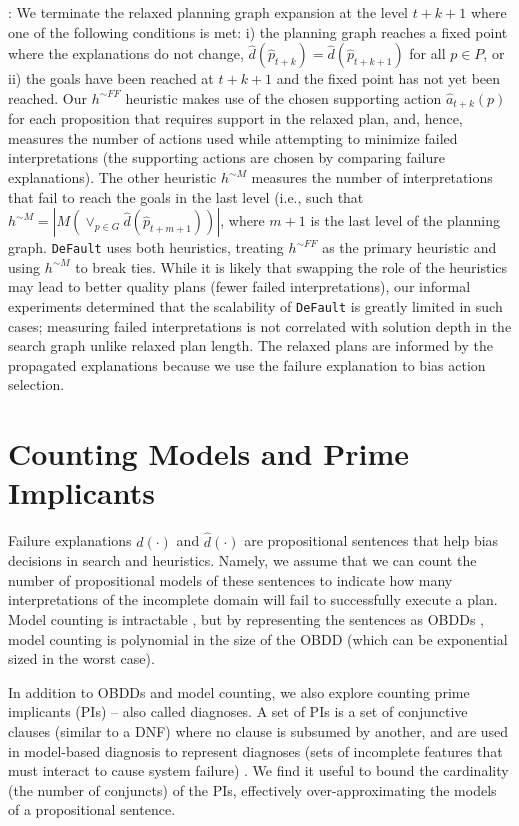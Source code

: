 \documentclass[letterpaper]{article}
\def\und#1{\noindent{\bf #1}:}
\def\default{{\tt DeFault}}
\def\citep#1{\cite{#1}}
\begin{document}
\und{Heuristic Computation}   We terminate the relaxed planning graph expansion
at the level $t+k+1$ where one of the following conditions is met: i) the
planning graph reaches a fixed point where the explanations do not change,
$\hat{d}(\hat{p}_{t+k}) = \hat{d}(\hat{p}_{t+k+1})$ for all $p\in P$, or ii) the
goals have been reached at $t+k+1$ and the fixed point has not yet been reached.
Our $h^{\sim FF}$ heuristic makes use of the chosen supporting action
$\hat{a}_{t+k}(p)$ for each proposition that requires support in the relaxed
plan, and, hence, measures the number of actions used while attempting to
minimize failed interpretations (the supporting actions are chosen by comparing
failure explanations). The other heuristic $h^{\sim M}$ measures the number of
interpretations that fail to reach the goals in the last level (i.e., such that 
$h^{\sim M} = |M(\vee_{p \in G} \hat{d}(\hat{p}_{t+m+1}))|$, where $m+1$ is the
last level of the planning graph. \default{} uses both heuristics, treating 
$h^{\sim FF}$ as the primary heuristic and using $h^{\sim M}$ to break ties. 
While it is likely that swapping the role of the heuristics may lead to better
quality plans (fewer failed interpretations), our informal experiments
determined that the scalability of \default{} is greatly limited in such cases;
measuring failed interpretations is not correlated with solution depth in the
search graph unlike relaxed plan length.  The relaxed plans are informed by the
propagated explanations because we use the failure explanation to bias action
selection.

\section{Counting Models and Prime Implicants }

Failure explanations $d(\cdot)$ and $\hat{d}(\cdot)$ are propositional sentences
that help bias decisions in search and heuristics.  Namely, we assume that we
can count the number of propositional models of these sentences to indicate how
many interpretations of the incomplete domain will fail to successfully execute
a plan.  Model counting is intractable \citep{Roth96}, but by representing the
sentences as OBDDs \citep{bryant-ieeetc86}, model counting is polynomial in the
size of the OBDD \citep{darwiche} (which can be exponential sized in the worst
case).

In addition to OBDDs and model counting, we also explore counting prime
implicants (PIs) -- also called diagnoses.  A set of PIs is a set of conjunctive
clauses (similar to a DNF) where no clause is subsumed by another, and are used
in model-based diagnosis to represent diagnoses (sets of incomplete features
that must interact to cause system failure) \citep{dekleer}.  We find it useful
to bound the cardinality (the number of conjuncts) of the PIs, effectively
over-approximating the models of a propositional sentence.
\end{document}

